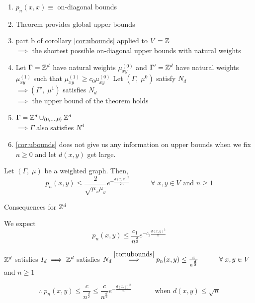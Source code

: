 \documentclass[main]{subfiles}
\begin{document}
\begin{remark}
    \begin{enumerate}
        \item $p_n(x,x) \equiv$ on-diagonal bounds
        \item Theorem provides global upper bounds
        \item part b of corollary \ref{cor:ubounds} applied to $V = \mathbb Z$\\
              $\implies$ the shortest possible on-diagonal upper bounds with natural weights
        \item Let $\Gamma = \mathbb Z^d$ have natural weights $\mu_{xy}^{(0)}$ and $\Gamma' = \mathbb Z^d$ have natural weights $\mu_{xy}^{(1)}$ such that $\mu_{xy}^{(1)} \geq c_0 \mu_{xy}^{(0)}$
              Let $(\Gamma,\;\mu^0)$ satisfy $N_d$\\
              $\implies (\Gamma',\;\mu^1)$ satisfies $N_d$\\
              $\implies$ the upper bound of the theorem holds
        \item $\Gamma = \mathbb Z^d \cup_{(0, \ldots, 0)} \mathbb Z^d$\\
              $\implies \Gamma$ also satisfies $N^d$
        \item \ref{cor:ubounds} does not give us any information on upper bounds when we fix $n \geq 0$ and let $d(x,y)$ get large.
    \end{enumerate}
\end{remark}
\begin{theorem}
    Let $(\Gamma,\;\mu)$ be a weighted graph. Then,
    \[p_n(x,y) \leq \frac{2}{\sqrt{\mu_x\mu_y}}e^{-\frac{d(x,y)^2}{2n}} \hspace{3em} \forall\;x,y \in V\text{ and }n \geq 1\]
\end{theorem}
\ex Consequences for $\mathbb Z^d$

We expect
\[p_n(x,y) \leq \frac{c_1}{n^\frac{d}{2}}e^{-c_2\frac{d(x,y)^2}{n}}\]

$\mathbb Z^d$ satisfies $I_d \implies \mathbb Z^d$ satisfies $N_d \stackrel{\ref{cor:ubounds}}{\implies} p_n(x,y) \leq \frac{c}{n^\frac{d}{2}} \hspace{3em} \forall\; x,y \in V$ and $n \geq 1$

\[\therefore\;p_n(x,y) \leq \frac{c}{n^\frac{d}{2}} \leq \frac{c}{n^\frac{d}{2}} e^{-\frac{d(x,y)^2}{n}} \hspace{3em}\text{ when }d(x,y)\leq\sqrt{n}\]
\end{document}
